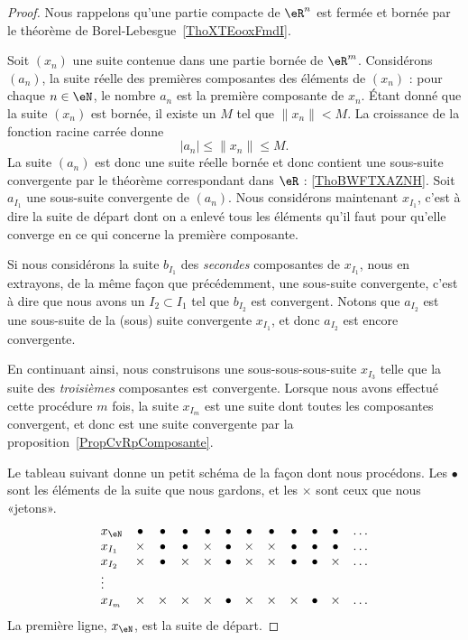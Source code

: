 \begin{proof}
    Nous rappelons qu'une partie compacte de \( \eR^n\) est fermée et bornée par le théorème de Borel-Lebesgue~\ref{ThoXTEooxFmdI}.

    Soit $(x_n)$ une suite contenue dans une partie bornée de $\eR^m$. Considérons $(a_n)$, la suite réelle des premières composantes des éléments de $(x_n)$ : pour chaque $n\in\eN$, le nombre $a_n$ est la première composante de $x_n$. Étant donné que la suite $(x_n)$ est bornée, il existe un $M$ tel que $\| x_n \|<M$. La croissance de la fonction racine carrée donne
	\begin{equation}
        | a_n |\leq\| x_n \|\leq M.
	\end{equation}
    La suite $(a_n)$ est donc une suite réelle bornée et donc contient une sous-suite convergente par le théorème correspondant dans \( \eR\) :  \ref{ThoBWFTXAZNH}. Soit $a_{I_1}$ une sous-suite convergente de $(a_n)$. Nous considérons maintenant $x_{I_1}$, c'est à dire la suite de départ dont on a enlevé tous les éléments qu'il faut pour qu'elle converge en ce qui concerne la première composante.

	Si nous considérons la suite $b_{I_1}$ des \emph{secondes} composantes de $x_{I_1}$, nous en extrayons, de la même façon que précédemment, une sous-suite convergente, c'est à dire que nous avons un $I_2\subset I_1$ tel que $b_{I_2}$ est convergent. Notons que $a_{I_2}$ est une sous-suite de la (sous) suite convergente $x_{I_1}$, et donc $a_{I_2}$ est encore convergente.

	En continuant ainsi, nous construisons une sous-sous-sous-suite $x_{I_3}$ telle que la suite des \emph{troisièmes} composantes est convergente. Lorsque nous avons effectué cette procédure $m$ fois, la suite $x_{I_m}$ est une suite dont toutes les composantes convergent, et donc est une suite convergente par la proposition~\ref{PropCvRpComposante}.

	Le tableau suivant donne un petit schéma de la façon dont nous procédons. Les $\bullet$ sont les éléments de la suite que nous gardons, et les $\times$ sont ceux que nous «jetons».
	\begin{equation}
		\begin{array}{lccccccccccc}
			x_{\eN}	&	\bullet&\bullet&\bullet&\bullet&\bullet&\bullet&\bullet&\bullet&\bullet&\bullet&\ldots\\
			x_{I_1}	&	\times&\bullet&\bullet&\times&\bullet&\times&\times&\bullet&\bullet&\bullet&\ldots\\
			x_{I_2}	&	\times&\bullet&\times&\times&\bullet&\times&\times&\bullet&\bullet&\times&\ldots\\
			\vdots\\
			x_{I_m}	&	\times&\times&\times&\times&\bullet&\times&\times&\times&\bullet&\times&\ldots
		\end{array}
	\end{equation}
	La première ligne, $x_{\eN}$, est la suite de départ.
\end{proof}

